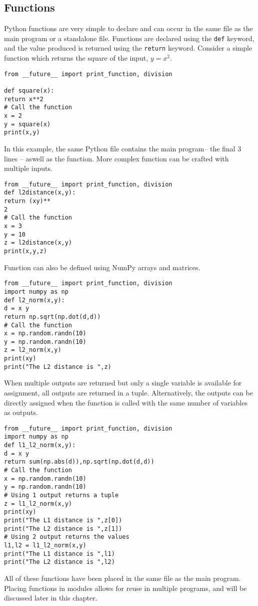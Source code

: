 \documentclass[KSmain.tex]{subfiles}
\begin{document}
\subsection{Functions}
Python functions are very simple to declare and can occur in the same file as the main program or a standalone
file. Functions are declared using the \texttt{def} keyword, and the value produced is returned using the
\texttt{return} keyword. Consider a simple function which returns the square of the input, $y = x^2$.
\begin{verbatim}
from __future__ import print_function, division

def square(x):
return x**2
# Call the function
x = 2
y = square(x)
print(x,y)
\end{verbatim}
In this example, the same Python file contains the main program– the final 3 lines – aswell as the function.
More complex function can be crafted with multiple inputs.
\begin{verbatim}
from __future__ import print_function, division
def l2distance(x,y):
return (xy)**
2
# Call the function
x = 3
y = 10
z = l2distance(x,y)
print(x,y,z)
\end{verbatim}
Function can also be defined using NumPy arrays and matrices.
\begin{verbatim}
from __future__ import print_function, division
import numpy as np
def l2_norm(x,y):
d = x y
return np.sqrt(np.dot(d,d))
# Call the function
x = np.random.randn(10)
y = np.random.randn(10)
z = l2_norm(x,y)
print(xy)
print("The L2 distance is ",z)
\end{verbatim}
When multiple outputs are returned but only a single variable is available for assignment, all outputs are
returned in a tuple. Alternatively, the outputs can be directly assigned when the function is called with
the same number of variables as outputs.
\begin{verbatim}
from __future__ import print_function, division
import numpy as np
def l1_l2_norm(x,y):
d = x y
return sum(np.abs(d)),np.sqrt(np.dot(d,d))
# Call the function
x = np.random.randn(10)
y = np.random.randn(10)
# Using 1 output returns a tuple
z = l1_l2_norm(x,y)
print(xy)
print("The L1 distance is ",z[0])
print("The L2 distance is ",z[1])
# Using 2 output returns the values
l1,l2 = l1_l2_norm(x,y)
print("The L1 distance is ",l1)
print("The L2 distance is ",l2)
\end{verbatim}
All of these functions have been placed in the same file as the main program. Placing functions in modules
allows for reuse in multiple programs, and will be discussed later in this chapter.
\end{document}
